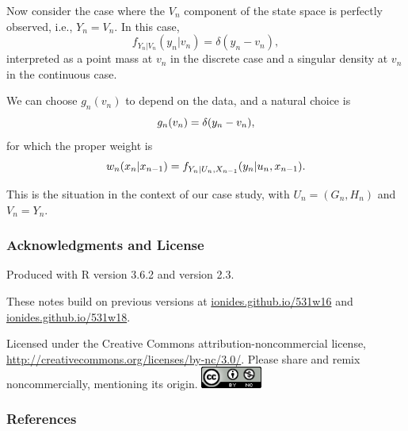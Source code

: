\documentclass{beamer}\usepackage[]{graphicx}\usepackage[]{color}
\begin{document}
\begin{frame}[fragile]

\bi

\item Now consider the case where the $V_n$ component of the state space is perfectly observed, i.e., $Y_n=V_n$. In this case, 
$$ 
f_{Y_n|V_n}(y_n|v_n) = \delta(y_n-v_n),
$$
interpreted as a point mass at $v_n$ in the discrete case and a singular density at $v_n$ in the continuous case. 

\item We can choose $g_n(v_n)$ to depend on the data, and a natural choice is 
$$
g_n(v_n)=\delta(y_n-v_n),
$$
for which the proper weight is
$$
w_{n}(x_n|x_{n-1}) = f_{Y_n|U_n,X_{n-1}}(y_n|u_n,x_{n-1}).
$$

\item This is the situation in the context of our case study, with $U_n=(G_n,H_n)$ and $V_n=Y_n$.


\ei

\end{frame}  

\begin{frame}[fragile]
\frametitle{Acknowledgments and License}

\bi
\item Produced with R version 3.6.2 and  version 2.3.

\item These notes build on previous versions at \url{ionides.github.io/531w16} and \url{ionides.github.io/531w18}. 
\item
Licensed under the Creative Commons attribution-noncommercial license, \url{http://creativecommons.org/licenses/by-nc/3.0/}.
Please share and remix noncommercially, mentioning its origin.  
\includegraphics[width=2cm]{cc-by-nc.png}
\ei

\end{frame}


\begin{frame}[allowframebreaks]
\frametitle{References}

\end{frame}
\end{document}

